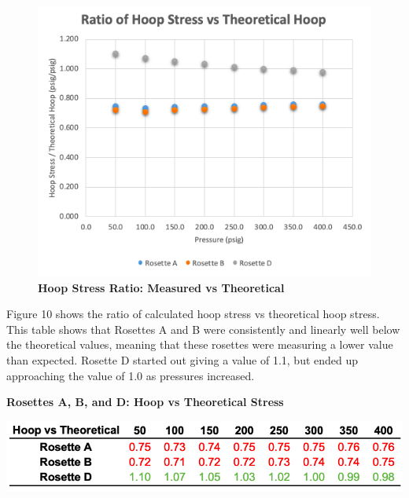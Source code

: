 \documentclass[12pt]{article}
\begin{document}
\begin{figure} [H]
	\centering
	\includegraphics [width=1.0\textwidth]{plot_hoop_vs_theoretical_ratio}
	\caption{ \textbf{Hoop Stress Ratio: Measured vs Theoretical }}
\end{figure} 
Figure 10 shows the ratio of calculated hoop stress vs theoretical hoop stress. This table shows that Rosettes A and B were consistently and linearly well below the theoretical values, meaning that these rosettes were measuring a lower value than expected. Rosette D started out giving a value of 1.1, but ended up approaching the value of 1.0 as pressures increased. 

\begin{table}[H]
  \caption{\textbf{Rosettes A, B, and D: Hoop vs Theoretical Stress }}
  \includegraphics[width=\linewidth]{table_hoop_theoretical}
  \centering
\end{table}
\newpage
\end{document}
